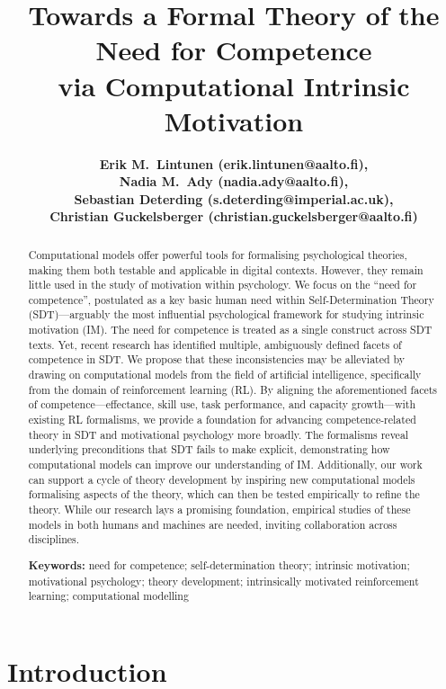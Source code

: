 \documentclass[10pt,letterpaper]{article}
\title{Towards a Formal Theory of the Need for Competence\\
via Computational Intrinsic Motivation}
\author{
{\large \bf Erik M.~Lintunen (erik.lintunen@aalto.fi),}\\
{\large \bf Nadia M.~Ady (nadia.ady@aalto.fi),}\\
{\large \bf Sebastian Deterding (s.deterding@imperial.ac.uk),}\\
{\large \bf Christian Guckelsberger (christian.guckelsberger@aalto.fi)}
}
\begin{document}
\maketitle


\begin{abstract}
Computational models offer powerful tools for formalising psychological theories, making them both testable and applicable in digital contexts.
However, they remain little used in the study of motivation within psychology.
We focus on the ``need for competence'', postulated as a key basic human need within Self-Determination Theory (SDT)---arguably the most influential psychological framework for studying intrinsic motivation (IM).
The need for competence is treated as a single construct across SDT texts. Yet, recent research has identified multiple, ambiguously defined facets of competence in SDT.
We propose that these inconsistencies may be alleviated by drawing on computational models from the field of artificial intelligence, specifically from the domain of reinforcement learning (RL).
By aligning the aforementioned facets of competence---effectance, skill use, task performance, and capacity growth---with existing RL formalisms, we provide a foundation for advancing competence-related theory in SDT and motivational psychology more broadly.
The formalisms reveal underlying preconditions that SDT fails to make explicit, demonstrating how computational models can improve our understanding of IM.
Additionally, our work can support a cycle of theory development by inspiring new computational models formalising aspects of the theory, which can then be tested empirically to refine the theory.
While our research lays a promising foundation, empirical studies of these models in both humans and machines are needed, inviting collaboration across disciplines.

\textbf{Keywords:}
need for competence;
self-determination theory;
intrinsic motivation;
motivational psychology;
theory development;
intrinsically motivated reinforcement learning;
computational modelling
\end{abstract}


\section{Introduction}
\end{document}
